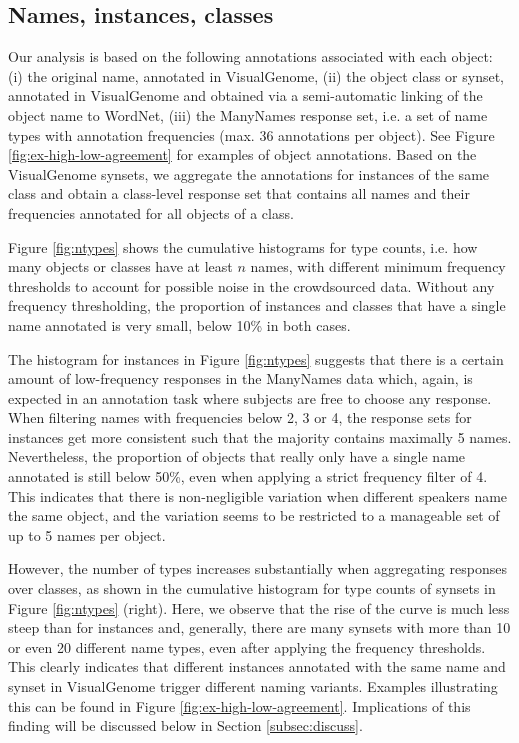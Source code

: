 \subsection{Names, instances, classes}
\label{subsec:counts}

Our analysis is based on the following annotations associated with each object: (i) the original name, annotated in VisualGenome, (ii) the object class or synset, annotated in VisualGenome and obtained via a semi-automatic linking of the object name to WordNet, (iii) the ManyNames response set, i.e. a set of name types with annotation frequencies (max. 36 annotations per object). See Figure \ref{fig:ex-high-low-agreement} for examples of object annotations. Based on the VisualGenome synsets, we aggregate the annotations for instances of the same class and obtain a class-level response set that contains all names and their frequencies annotated for all objects of a class. 
 
Figure \ref{fig:ntypes} shows the cumulative histograms for type counts, i.e. how many objects or classes have at least $n$ names, with different minimum frequency thresholds to account for possible noise in the crowdsourced data.
Without any frequency thresholding, the proportion of instances and classes that have a single name annotated is very small, below 10\% in both cases. 

The histogram for instances in Figure \ref{fig:ntypes} suggests that there is a certain amount of low-frequency responses in the ManyNames data which, again, is expected in an annotation task where subjects are free to choose any response. When filtering names with frequencies below 2, 3 or 4, the response sets for instances get more consistent such that the majority contains maximally 5 names.
Nevertheless, the proportion of objects that really only have a single name annotated is still below 50\%, even when applying a strict frequency filter of 4.
This indicates that there is non-negligible variation when different speakers name the same object, and the variation seems to be restricted to a manageable set of up to 5 names per object.

However, the number of types increases substantially when aggregating responses over classes, as shown in the cumulative histogram for type counts of synsets in Figure \ref{fig:ntypes} (right).
Here, we observe that the rise of the curve is much less steep than for instances and, generally, there are many synsets with more than 10 or even 20 different name types, even after applying the frequency thresholds. This clearly indicates that different instances annotated with the same name and synset in VisualGenome trigger different naming variants. Examples illustrating this can be found in Figure \ref{fig:ex-high-low-agreement}. 
Implications of this finding will be discussed below in Section \ref{subsec:discuss}.

